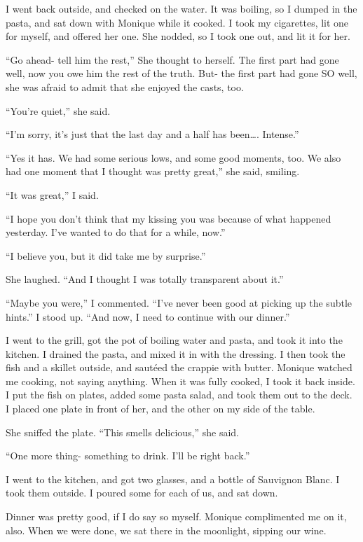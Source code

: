 I went back outside, and checked on the water. It was boiling, so I dumped in the pasta,
and sat down with Monique while it cooked. I took my cigarettes, lit one for myself, and offered
her one. She nodded, so I took one out, and lit it for her.

\begin{thought}
``Go ahead- tell him the rest,'' She thought to herself. The first part had gone well, now
you owe him the rest of the truth. But- the first part had gone SO well, she was afraid to admit
that she enjoyed the casts, too.
\end{thought}

``You're quiet,'' she said.

``I'm sorry, it's just that the last day and a half has been…. Intense.''

``Yes it has. We had some serious lows, and some good moments, too. We also had one moment
that I thought was pretty great,'' she said, smiling.

``It was great,'' I said.

``I hope you don't think that my kissing you was because of what happened yesterday. I've
wanted to do that for a while, now.''

``I believe you, but it did take me by surprise.''

She laughed. ``And I thought I was totally transparent about it.''

``Maybe you were,'' I commented. ``I've never been good at picking up the subtle hints.''
I stood up. ``And now, I need to continue with our dinner.''

I went to the grill, got the pot of boiling water and pasta, and took it into the kitchen.
I drained the pasta, and mixed it in with the dressing. I then took the fish and a skillet
outside, and sautéed the crappie with butter. Monique watched me cooking, not saying anything.
When it was fully cooked, I took it back inside. I put the fish on plates, added some pasta
salad, and took them out to the deck. I placed one plate in front of her, and the other on my
side of the table.

She sniffed the plate. ``This smells delicious,'' she said.

``One more thing- something to drink. I'll be right back.''

I went to the kitchen, and got two glasses, and a bottle of Sauvignon Blanc. I took them
outside. I poured some for each of us, and sat down.

Dinner was pretty good, if I do say so myself. Monique complimented me on it, also. When
we were done, we sat there in the moonlight, sipping our wine.

